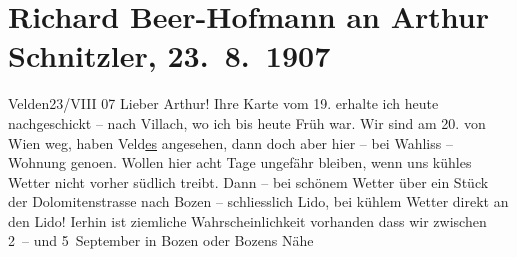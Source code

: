 

         
         \renewcommand{\erwaehntePersonen}{Personen: Hermann Beer, Paul Goldmann, Fedor Mamroth, Olga Schnitzler}
         \renewcommand{\erwaehnteOrte}{Orte: Bozen, Etablissement Ernst Wahliss, Große Dolomitenstraße, Lido, Velden am Wörthersee, Veldes, Villach, Welsberg-Taisten, Wien}
         \renewcommand{\erwaehnteWerke}{}
               \section[Richard Beer-Hofmann an Arthur Schnitzler, 23. 8. 1907]{ Richard Beer-Hofmann an Arthur Schnitzler, 23. 8. 1907}\nopagebreak{}\rehead{ }\begin{ledgroupsized}[t]{13cm}\normalsize\beginnumbering \toendnotes[C]{\smallbreak\pagebreak[2]} 
\toendnotes[C]{\smallbreak}\pstart
           \raggedleft{}{\pb}Velden23/VIII 07\pend
           \pstart
           Lieber Arthur! Ihre Karte vom 19. erhalte ich heute
               nachgeschickt – nach Villach, wo ich bis heute
               Früh war. Wir sind am 20. von Wien weg,
               haben Veld\uline{es} angesehen, dann doch aber hier – bei Wahliss
               – Wohnung geno{\geminationm}en. Wollen hier acht Tage ungefähr
               bleiben, wenn uns kühles Wetter nicht vorher südlich treibt. Dann – bei schönem
               Wetter über ein Stück der Dolomitenstrasse nach
                  {\pb}Bozen – schliesslich Lido, bei kühlem Wetter direkt an den Lido!
                  I{\geminationm}erhin ist ziemliche Wahrscheinlichkeit vorhanden
               dass wir zwischen 2 – und 5 September in Bozen oder Bozens Nähe

\end{ledgroupsized}

